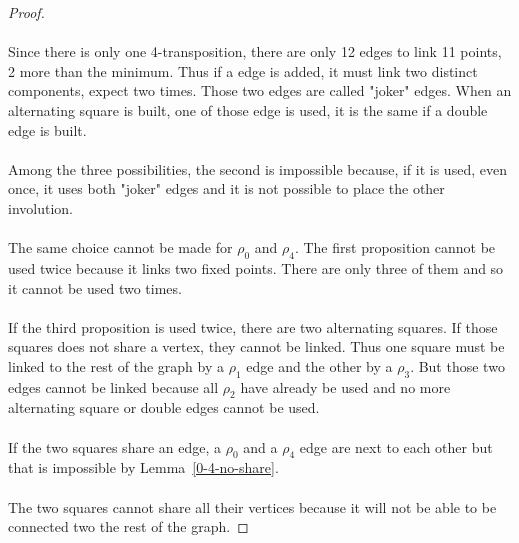 \begin{proof}
\paragraph{}
Since there is only one 4-transposition, there are only 12 edges to link 11 points, 2 more than the minimum. Thus if a edge is added, it must link two distinct components, expect two times. Those two edges are called "joker" edges. When an alternating square is built, one of those edge is used, it is the same if a double edge is built.

\paragraph{}
Among the three possibilities, the second is impossible because, if it is used, even once, it uses both "joker" edges and it is not possible to place the other involution.

\paragraph{}
The same choice cannot be made for $\rho_0$ and $\rho_4$. The first proposition cannot be used twice because it links two fixed points. There are only three of them and so it cannot be used two times.

\paragraph{}
If the third proposition is used twice, there are two alternating squares. If those squares does not share a vertex, they cannot be linked. Thus one square must be linked to the rest of the graph by a $\rho_1$ edge and the other by a $\rho_3$. But those two edges cannot be linked because all $\rho_2$ have already be used and no more alternating square or double edges cannot be used.

\paragraph{}
If the two squares share an edge, a $\rho_0$ and a $\rho_4$ edge are next to each other but that is impossible by Lemma~\ref{0-4-no-share}.

\paragraph{}
The two squares cannot share all their vertices because it will not be able to be connected two the rest of the graph.


\end{proof}
